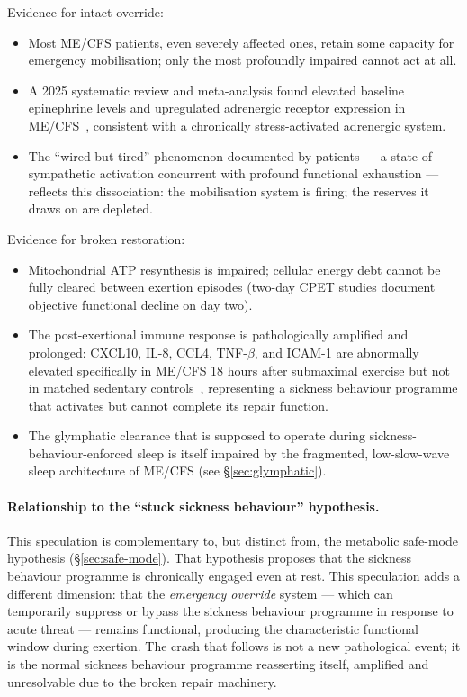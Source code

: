 \begin{speculation}
Evidence for intact override:
\begin{itemize}
  \item Most ME/CFS patients, even severely affected ones, retain some capacity for emergency
    mobilisation; only the most profoundly impaired cannot act at all.
  \item A 2025 systematic review and meta-analysis found elevated baseline epinephrine levels
    and upregulated adrenergic receptor expression in ME/CFS~\cite{Hendrix2025AdrenergicDysfunction},
    consistent with a chronically stress-activated adrenergic system.
  \item The ``wired but tired'' phenomenon documented by patients --- a state of sympathetic
    activation concurrent with profound functional exhaustion --- reflects this dissociation:
    the mobilisation system is firing; the reserves it draws on are depleted.
\end{itemize}

Evidence for broken restoration:
\begin{itemize}
  \item Mitochondrial ATP resynthesis is impaired; cellular energy debt cannot be fully cleared
    between exertion episodes (two-day CPET studies document objective functional decline on
    day two).
  \item The post-exertional immune response is pathologically amplified and prolonged:
    CXCL10, IL-8, CCL4, TNF-$\beta$, and ICAM-1 are abnormally elevated specifically in
    ME/CFS 18 hours after submaximal exercise but not in matched sedentary
    controls~\cite{Moneghetti2018}, representing a sickness behaviour
    programme that activates but cannot complete its repair function.
  \item The glymphatic clearance that is supposed to operate during sickness-behaviour-enforced
    sleep is itself impaired by the fragmented, low-slow-wave sleep architecture of ME/CFS (see
    \S\ref{sec:glymphatic}).
\end{itemize}

\paragraph{Relationship to the ``stuck sickness behaviour'' hypothesis.}
This speculation is complementary to, but distinct from, the metabolic safe-mode hypothesis
(\S\ref{sec:safe-mode}). That hypothesis proposes that the sickness behaviour programme is
chronically engaged even at rest. This speculation adds a different dimension: that the
\emph{emergency override} system --- which can temporarily suppress or bypass the sickness
behaviour programme in response to acute threat --- remains functional, producing the
characteristic functional window during exertion. The crash that follows is not a new pathological
event; it is the normal sickness behaviour programme reasserting itself, amplified and
unresolvable due to the broken repair machinery.


\end{speculation}

